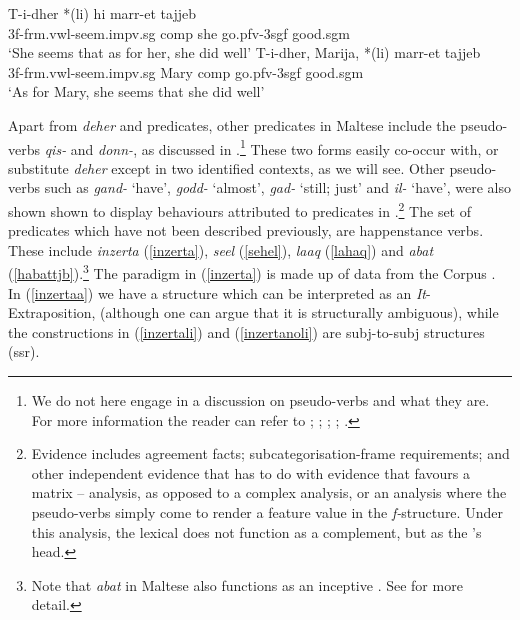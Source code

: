 \documentclass[output=paper]{LSP/langsci}
\begin{document}
\ea
\ea \label{focdeher}
\gll T-i-dher *(li) {\sc hi} marr-et tajjeb\\
3{\sc f}-{\sc frm.vwl}-seem.{\sc impv.sg} {\sc comp} she go.{\sc pfv-3sgf} good.{\sc sgm}\\
\glt `She seems that as for her, she did well'
\ex \label{rightdislocdeher}
\gll T-i-dher, Marija, *(li) marr-et tajjeb\\
3{\sc f}-{\sc frm.vwl}-seem.{\sc impv.sg} Mary {\sc comp} go.{\sc pfv-3sgf} good.{\sc sgm}\\
\glt `As for Mary, she seems that she did well'
\z
\z

Apart from \emph{deher} and  predicates, other  predicates in Maltese include the pseudo-verbs \emph{qis-} and \emph{donn-}, as discussed in \citet{CES:LFG14}.\footnote{We do not here engage in a discussion on pseudo-verbs and what they are. For more information the reader can refer to ; ; ; ; .} These two forms easily co-occur with, or substitute \emph{deher} except in two identified contexts, as we will see. Other pseudo-verbs such as \emph{g\textcrh and-} `have', \emph{g\textcrh odd-} `almost', \emph{g\textcrh ad-} `still; just' and \emph{il-} `have', 
were also shown shown to display behaviours attributed to  predicates in \cite{Camilleri16}.\footnote{Evidence includes agreement facts; subcategorisation-frame requirements; and other independent evidence that has to do with evidence that favours a matrix  --  analysis, as opposed to a complex  analysis, or an analysis where the pseudo-verbs simply come to render a feature value in the \emph{f-}structure. Under this analysis,
the lexical  does not function as a complement, but as the 's head.} The set of  predicates which have not been described previously,
are happenstance verbs. These include \emph{inzerta} (\ref{inzerta}), \emph{se\textcrh el} (\ref{sehel}), \emph{la\textcrh aq} (\ref{lahaq}) and \emph{\textcrh abat} (\ref{habattjb}).\footnote{Note that \emph{\textcrh abat} in Maltese also functions as an {\sc inceptive} . See  for more detail.} The paradigm in (\ref{inzerta}) is made up of data from the  Corpus . In (\ref{inzertaa}) we have a structure which can be interpreted as an \emph{It}-Extraposition, (although one can argue that it is structurally ambiguous), while the constructions in (\ref{inzertali}) and (\ref{inzertanoli}) are {\sc subj}-to-{\sc subj}  structures ({\sc ssr}). 
\end{document}
